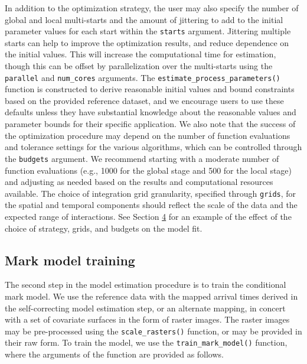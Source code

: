{In addition to the optimization strategy, the user may also specify the number of global and local multi-starts and the amount of jittering to add to the initial parameter values for each start within the \texttt{starts} argument. Jittering multiple starts can help to improve the optimization results, and reduce dependence on the initial values. This will increase the computational time for estimation, though this can be offset by parallelization over the multi-starts using the \texttt{parallel} and \texttt{num\_cores} arguments. The \texttt{estimate\_process\_parameters()} function is constructed to derive reasonable initial values and bound constraints based on the provided reference dataset, and we encourage users to use these defaults unless they have substantial knowledge about the reasonable values and parameter bounds for their specific application. We also note
that the success of the optimization procedure may depend on the number of function evaluations and tolerance settings for the various algorithms, which can be controlled through the \texttt{budgets} argument. We recommend starting with a moderate number of function evaluations (e.g., 1000 for the global stage and 500 for the local stage) and adjusting as needed based on the results and computational resources available. The choice of integration grid granularity, specified through \texttt{grids}, for the spatial and temporal components should reflect the scale of the data and the expected range of interactions. See Section \hyperref[sec:application]{4} for an example of the effect of the choice of strategy, grids, and budgets on the model fit.}

\subsection{Mark model training}\label{markmodel}

The second step in the model estimation procedure is to train the
conditional mark model. We use the reference data with the mapped
arrival times derived in the self-correcting model estimation step, or
an alternate mapping, in concert with a set of covariate surfaces in the
form of raster images. The raster images may be pre-processed using the
\texttt{scale\_rasters()} function, or may be provided in their raw form. To
train the model, we use the \texttt{train\_mark\_model()} function, where the
arguments of the function are provided as follows.

